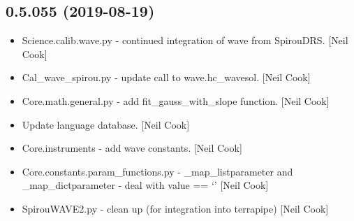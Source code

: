\documentclass[a4paper,10pt,english]{report}
\begin{document}
\subsection{0.5.055 (2019-08-19)}
\label{\detokenize{misc/changelog:id86}}\begin{itemize}
\item {} 
Science.calib.wave.py - continued integration of wave from SpirouDRS.
{[}Neil Cook{]}

\item {} 
Cal\_wave\_spirou.py - update call to wave.hc\_wavesol. {[}Neil Cook{]}

\item {} 
Core.math.general.py - add fit\_gauss\_with\_slope function. {[}Neil Cook{]}

\item {} 
Update language database. {[}Neil Cook{]}

\item {} 
Core.instruments - add wave constants. {[}Neil Cook{]}

\item {} 
Core.constants.param\_functions.py - \_map\_listparameter and
\_map\_dictparameter - deal with value == ‘’ {[}Neil Cook{]}

\item {} 
SpirouWAVE2.py - clean up (for integration into terrapipe) {[}Neil Cook{]}

\end{itemize}
\end{document}
